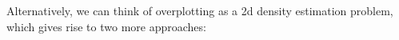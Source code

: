 \begin{itemize}
    
  
\end{itemize}

Alternatively, we can think of overplotting as a 2d density estimation problem, which gives rise to two more approaches:
  
